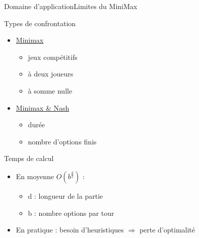 \begin{frame}{Domaine d'application}{Limites du MiniMax}

\begin{block}{Types de confrontation}
\begin{itemize}
\item \underline{Minimax}
\begin{itemize}
\item jeux compétitifs
\item à deux joueurs
\item à somme nulle
\end{itemize}
\item \underline{Minimax \& Nash}
\begin{itemize}
\item durée
\item nombre d'options finis
\end{itemize}
\end{itemize}
\end{block}

\pause

\begin{block}{Temps de calcul}
\begin{itemize}
\item En moyenne \emph{$O(b^{\frac{d}{2}})$} :
	\begin{itemize}
	\item d : longueur de la partie
	\item b : nombre options par tour
	\end{itemize}
\item En pratique : besoin d'heuristiques $\Rightarrow$ perte d'optimalité
\end{itemize}
\end{block}

\end{frame}
